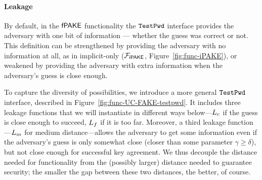
\paragraph{Leakage}
By default, in the $\textsf{fPAKE}$ functionality the $\texttt{TestPwd}$ interface provides the adversary with one bit of information --- whether the \password guess was correct or not. 
This definition can be strengthened by providing the adversary with no information at all, as in implicit-only \PAKE ($\mathcal{F}_\textsf{iPAKE}$, Figure~\ref{fig:func-iPAKE}), or weakened by providing the adversary with extra information when the adversary's guess is close enough. 

To capture the diversity of possibilities, we introduce a more general  $\texttt{TestPwd}$ interface, described in Figure~\ref{fig:func-UC-FAKE-testpwd}. 
It includes three leakage functions that we will instantiate in different ways below---$L_{c}$ if the guess is close enough to succeed, $L_{f}$ if it is too far.
Moreover, a third leakage function---$L_{m}$ for medium distance---allows the adversary to get some information even if the adversary's guess is only somewhat close (closer than some parameter $\gamma \ge \delta$), but not close enough for successful key agreement. 
We thus decouple the distance needed for functionality from the (possibly larger) distance needed to guarantee security; the smaller the gap between these two distances, the better, of course.

